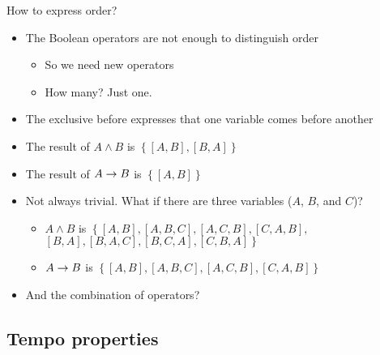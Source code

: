 \documentclass{beamer}
\def\xbeforeop{\ensuremath\rightarrow}
\newcommand{\xbefore}[2]{\ensuremath #1 \xbeforeop #2 }
\begin{document}
\begin{frame}[label=expressorder]{How to express order?}
	\begin{itemize}
		\item The Boolean operators are not enough to distinguish order
		\begin{itemize}
			\item So we need new operators
			\item How many? Just one.
		\end{itemize}
		\item The exclusive before expresses that one variable comes before another \hyperlink{xbeforedefs}{}
		\item The result of $A\land B$ is
		$\left\{
			\left[A,B\right],
			\left[B,A\right]
		\right\}$
		\item The result of $\xbefore{A}{B}$ is
		$\left\{
			\left[A,B\right]
		\right\}$
		\item Not always trivial. What if there are three variables ($A$, $B$, and $C$)?
		\begin{itemize}
			\item $A\land B$ is 
				$\left\{
					\left[A,B\right],
					\left[A,B,C\right], 
					\left[A,C,B\right],
					\left[C,A,B\right],\right. $
					$\left.
						\left[B,A\right],
						\left[B,A,C\right], 
						\left[B,C,A\right],
						\left[C,B,A\right]
					\right\}$
			\item $\xbefore{A}{B}$ is 
				$\left\{
					\left[A,B\right], 
					\left[A,B,C\right], 
					\left[A,C,B\right],
					\left[C,A,B\right]
				\right\} $
		\end{itemize}
		\item And the combination of operators?
	\end{itemize}
\end{frame}

\subsection{Tempo properties}
\end{document}
